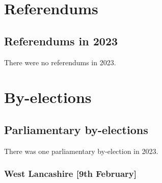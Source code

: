 \documentclass[a4paper,openany]{book}
\begin{document}



\part{Referendums}

\chapter{Referendums in 2023}

There were no referendums in 2023.




\part{By-elections}

\chapter{Parliamentary by-elections}

There was one parliamentary by-election in 2023.

%
%
%
%
%
%
%
%
%
%

\section*{West Lancashire \hspace*{\fill}\nolinebreak[1]%
	\enspace\hspace*{\fill}
	[9th February]}
\end{document}
